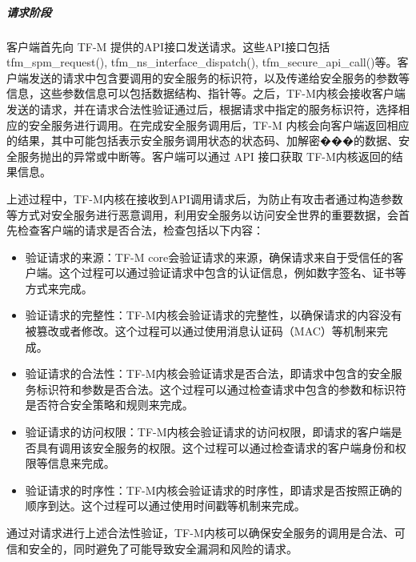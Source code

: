 \documentclass[12pt,a4paper]{ctexart}
\numberwithin{figure}{section}
\begin{document}
\subparagraph{请求阶段}
\par 客户端首先向 TF-M 提供的API接口发送请求。这些API接口包括tfm\_spm\_request(), tfm\_ns\_interface\_dispatch(), tfm\_secure\_api\_call()等。客户端发送的请求中包含要调用的安全服务的标识符，以及传递给安全服务的参数等信息，这些参数信息可以包括数据结构、指针等。之后，TF-M内核会接收客户端发送的请求，并在请求合法性验证通过后，根据请求中指定的服务标识符，选择相应的安全服务进行调用。在完成安全服务调用后，TF-M 内核会向客户端返回相应的结果，其中可能包括表示安全服务调用状态的状态码、加解密���的数据、安全服务抛出的异常或中断等。客户端可以通过 API 接口获取 TF-M内核返回的结果信息。
\par 上述过程中，TF-M内核在接收到API调用请求后，为防止有攻击者通过构造参数等方式对安全服务进行恶意调用，利用安全服务以访问安全世界的重要数据，会首先检查客户端的请求是否合法，检查包括以下内容：
\begin{itemize}
    \item 验证请求的来源：TF-M core会验证请求的来源，确保请求来自于受信任的客户端。这个过程可以通过验证请求中包含的认证信息，例如数字签名、证书等方式来完成。
    \item 验证请求的完整性：TF-M内核会验证请求的完整性，以确保请求的内容没有被篡改或者修改。这个过程可以通过使用消息认证码（MAC）等机制来完成。
    \item  验证请求的合法性：TF-M内核会验证请求是否合法，即请求中包含的安全服务标识符和参数是否合法。这个过程可以通过检查请求中包含的参数和标识符是否符合安全策略和规则来完成。
    \item  验证请求的访问权限：TF-M内核会验证请求的访问权限，即请求的客户端是否具有调用该安全服务的权限。这个过程可以通过检查请求的客户端身份和权限等信息来完成。
    \item  验证请求的时序性：TF-M内核会验证请求的时序性，即请求是否按照正确的顺序到达。这个过程可以通过使用时间戳等机制来完成。
\end{itemize}
\par 通过对请求进行上述合法性验证，TF-M内核可以确保安全服务的调用是合法、可信和安全的，同时避免了可能导致安全漏洞和风险的请求。
\end{document}

